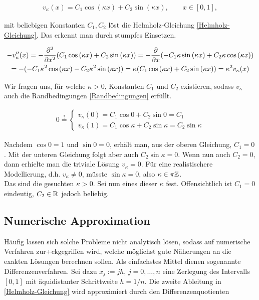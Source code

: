 \begin{align}
  v_\kappa(x) = C_1 \cos{(\kappa x)} + C_2 \sin{(\kappa x)}, \qquad
  x \in [0, 1],
  \label{Analytische_Lösung}
\end{align}

mit beliebigen Konstanten $C_1, C_2$ löst die Helmholz-Gleichung \eqref{Helmholz-Gleichung}. Das erkennt man durch stumpfes Einsetzen.

\begin{multline*}
  - v_\kappa^{\prime \prime}(x)
  = - \frac{\partial^2}{\partial x^2}
    (C_1 \cos{(\kappa x)} + C_2 \sin{(\kappa x)})
  = - \frac{\partial}{\partial x}
    (- C_1 \kappa \sin{(\kappa x)} + C_2 \kappa \cos{(\kappa x)}) \\
  = - (- C_1 \kappa^2 \cos{(\kappa x)} - C_2 \kappa^2 \sin{(\kappa x)})
  = \kappa (C_1 \cos{(\kappa x)} + C_2 \sin{(\kappa x)})
  = \kappa^2 v_\kappa(x)
\end{multline*}

Wir fragen uns, für welche $\kappa > 0$, Konstanten $C_1$ und $C_2$ existieren, sodass $v_\kappa$ auch die Randbedingungen \eqref{Randbedingungen} erfüllt.

\begin{align*}
  0 \stackrel{!}{=}
  \begin{cases}
    v_\kappa(0)
    = C_1 \cos{0} + C_2 \sin{0}
    = C_1 \\
    v_\kappa(1)
    = C_1 \cos{\kappa} + C_2 \sin{\kappa}
    = C_2 \sin{\kappa}
  \end{cases}
\end{align*}

Nachdem $\cos{0} = 1$ und $\sin{0} = 0$, erhält man, aus der oberen Gleichung, $C_1 = 0$. Mit der unteren Gleichung folgt aber auch $C_2 \sin{\kappa} = 0$. Wenn nun auch $C_2 = 0$, dann erhielte man die triviale Lösung $v_\kappa = 0$. Für eine realistischere Modellierung, d.h. $v_\kappa \neq 0$, müsste $\sin{\kappa} = 0$, also $\kappa \in \pi \mathbb{Z}$. \\

Das sind die gesuchten $\kappa > 0$. Sei nun eines dieser $\kappa$ fest. Offensichtlich ist $C_1 = 0$ eindeutig, $C_2 \in \mathbb{R}$ jedoch beliebig.

\subsection{Numerische Approximation}

Häufig lassen sich solche Probleme nicht analytisch lösen, sodass auf numerische Verfahren zur+ckgegriffen wird, welche möglichst gute Näherungen an die exakten Lösungen berechnen sollen. Als einfachstes Mittel dienen sogenannte Differenzenverfahren. Sei dazu $x_j := jh$, $j = 0, \ldots, n$ eine Zerlegung des Intervalls $[0, 1]$ mit äquidistanter Schrittweite $h = 1/n$. Die zweite Ableitung in \eqref{Helmholz-Gleichung} wird approximiert durch den Differenzenquotienten

